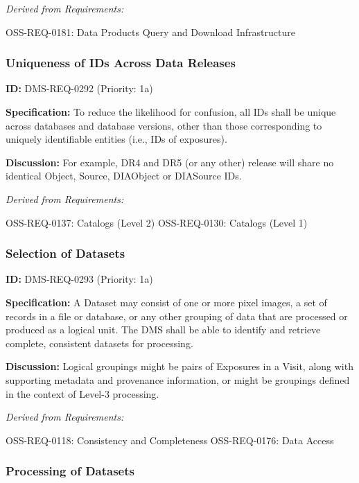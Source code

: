 \documentclass[SE,toc,lsstdraft]{lsstdoc}
\begin{document}
\emph{Derived from Requirements:}

OSS-REQ-0181:
Data Products Query and Download Infrastructure \newline

\subsubsection{Uniqueness of IDs Across Data Releases}

\label{DMS-REQ-0292}
\textbf{ID:} DMS-REQ-0292 (Priority: 1a)

\textbf{Specification:} To reduce the likelihood for confusion, all IDs shall be unique across databases and database versions, other than those corresponding to uniquely identifiable entities (i.e., IDs of exposures).

\textbf{Discussion:}
For example, DR4 and DR5 (or any other) release will share no identical Object, Source, DIAObject or DIASource IDs.

\emph{Derived from Requirements:}

OSS-REQ-0137:
Catalogs (Level 2) \newline
OSS-REQ-0130:
Catalogs (Level 1) \newline

\subsubsection{Selection of Datasets}

\label{DMS-REQ-0293}
\textbf{ID:} DMS-REQ-0293 (Priority: 1a)

\textbf{Specification:} A Dataset may consist of one or more pixel images, a set of records in a file or database, or any other grouping of data that are processed or produced as a logical unit. The DMS shall be able to identify and retrieve complete, consistent datasets for processing.

\textbf{Discussion: }Logical groupings might be pairs of Exposures in a Visit, along with supporting metadata and provenance information, or might be groupings defined in the context of Level-3 processing.

\emph{Derived from Requirements:}

OSS-REQ-0118:
Consistency and Completeness \newline
OSS-REQ-0176:
Data Access \newline

\subsubsection{Processing of Datasets}
\end{document}
